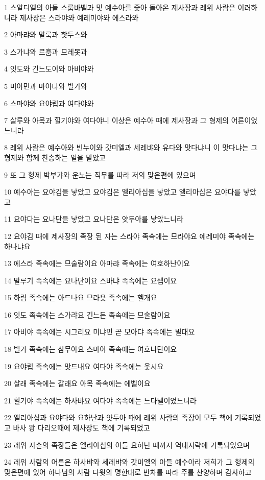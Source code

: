 \par 1 스알디엘의 아들 스룹바벨과 및 예수아를 좇아 돌아온 제사장과 레위 사람은 이러하니라 제사장은 스라야와 예레미야와 에스라와
\par 2 아마랴와 말룩과 핫두스와
\par 3 스가냐와 르훔과 므레못과
\par 4 잇도와 긴느도이와 아비야와
\par 5 미야민과 마아댜와 빌가와
\par 6 스마야와 요야립과 여다야와
\par 7 살루와 아목과 힐기야와 여다야니 이상은 예수아 때에 제사장과 그 형제의 어른이었느니라
\par 8 레위 사람은 예수아와 빈누이와 갓미엘과 세레뱌와 유다와 맛다냐니 이 맛다냐는 그 형제와 함께 찬송하는 일을 맡았고
\par 9 또 그 형제 박부갸와 운노는 직무를 따라 저의 맞은편에 있으며
\par 10 예수아는 요야김을 낳았고 요야김은 엘리아십을 낳았고 엘리아십은 요야다를 낳았고
\par 11 요야다는 요나단을 낳았고 요나단은 얏두아를 낳았느니라
\par 12 요야김 때에 제사장의 족장 된 자는 스라야 족속에는 므라야요 예레미야 족속에는 하나냐요
\par 13 에스라 족속에는 므술람이요 아마랴 족속에는 여호하난이요
\par 14 말루기 족속에는 요나단이요 스바냐 족속에는 요셉이요
\par 15 하림 족속에는 아드나요 므라욧 족속에는 헬개요
\par 16 잇도 족속에는 스가랴요 긴느돈 족속에는 므술람이요
\par 17 아비야 족속에는 시그리요 미냐민 곧 모아댜 족속에는 빌대요
\par 18 빌가 족속에는 삼무아요 스마야 족속에는 여호나단이요
\par 19 요야립 족속에는 맛드내요 여다야 족속에는 웃시요
\par 20 살래 족속에는 갈래요 아목 족속에는 에벨이요
\par 21 힐기야 족속에는 하사뱌요 여다야 족속에는 느다넬이었느니라
\par 22 엘리아십과 요야다와 요하난과 얏두아 때에 레위 사람의 족장이 모두 책에 기록되었고 바사 왕 다리오때에 제사장도 책에 기록되었고
\par 23 레위 자손의 족장들은 엘리아십의 아들 요하난 때까지 역대지략에 기록되었으며
\par 24 레위 사람의 어른은 하사뱌와 세레뱌와 갓미엘의 아들 예수아라 저희가 그 형제의 맞은편에 있어 하나님의 사람 다윗의 명한대로 반차를 따라 주를 찬양하며 감사하고
